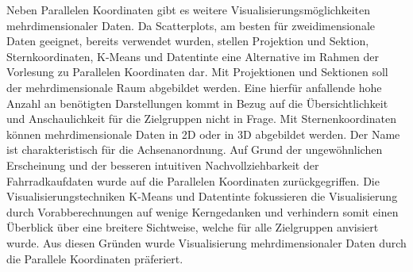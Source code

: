 \documentclass[usegeometry=true]{scrartcl}
\begin{document}
Neben Parallelen Koordinaten gibt es weitere Visualisierungsmöglichkeiten mehrdimensionaler Daten. Da Scatterplots, am besten für zweidimensionale Daten geeignet, bereits verwendet wurden, stellen Projektion und Sektion, Sternkoordinaten, K-Means und Datentinte eine Alternative im Rahmen der Vorlesung zu Parallelen Koordinaten dar. Mit Projektionen und Sektionen soll der mehrdimensionale Raum abgebildet werden. Eine hierfür anfallende hohe Anzahl an benötigten Darstellungen kommt in Bezug auf die Übersichtlichkeit und Anschaulichkeit für die Zielgruppen nicht in Frage. Mit Sternenkoordinaten können mehrdimensionale Daten in 2D oder in 3D abgebildet werden. Der Name ist charakteristisch für die Achsenanordnung. Auf Grund der ungewöhnlichen Erscheinung und der besseren intuitiven Nachvollziehbarkeit der Fahrradkaufdaten wurde auf die Parallelen Koordinaten zurückgegriffen. Die Visualisierungstechniken K-Means und Datentinte fokussieren die Visualisierung durch Vorabberechnungen auf wenige Kerngedanken und verhindern somit einen Überblick über eine breitere Sichtweise, welche für alle Zielgruppen anvisiert wurde. Aus diesen Gründen wurde Visualisierung mehrdimensionaler Daten durch die Parallele Koordinaten präferiert. 
\end{document}
